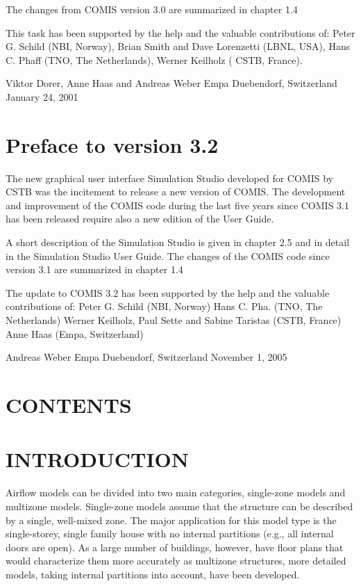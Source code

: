 \documentclass[10pt]{article}
\begin{document}
The changes from COMIS version 3.0 are summarized in chapter 1.4 

This task has been supported by the help and the valuable contributions of: 
Peter G. Schild (NBI, Norway), Brian Smith and Dave Lorenzetti (LBNL, USA), Hans C. Phaff (TNO, The Netherlands), Werner Keilholz ( CSTB, France). 

Viktor Dorer, Anne Haas and Andreas Weber 
Empa Duebendorf, Switzerland 
January 24, 2001 

\section{Preface to version 3.2}
The new graphical user interface Simulation Studio developed for COMIS by CSTB was the incitement to release a new version of COMIS. The development and improvement of the COMIS code during the last five years since COMIS 3.1 has been released require also a new edition of the User Guide. 

A short description of the Simulation Studio is given in chapter 2.5 and in detail in the Simulation Studio User Guide. The changes of the COMIS code since version 3.1 are summarized in chapter 1.4 

The update to COMIS 3.2 has been supported by the help and the valuable contributions of: 
Peter G. Schild (NBI, Norway) 
Hans C. Pha. (TNO, The Netherlands) 
Werner Keilholz, Paul Sette and Sabine Taristas (CSTB, France) 
Anne Haas (Empa, Switzerland) 

Andreas Weber 
Empa Duebendorf, Switzerland 
November 1, 2005

\section{CONTENTS}

\section{INTRODUCTION}
Airflow models can be divided into two main categories, single-zone models and multizone models. Single-zone models assume that the structure can be described by a single, well-mixed zone. The major application for this model type is the single-storey, single family house with no internal partitions (e.g., all internal doors are open). As a large number of buildings, however, have floor plans that would characterize them more accurately as multizone structures, more detailed models, taking internal partitions into account, have been developed.
\end{document}
